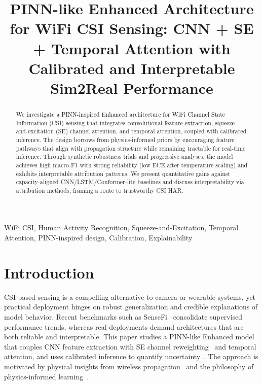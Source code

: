 \documentclass[journal]{IEEEtran}
\begin{document}
\title{PINN-like Enhanced Architecture for WiFi CSI Sensing: CNN + SE + Temporal Attention with Calibrated and Interpretable Sim2Real Performance}

\author{
}

\maketitle

\begin{abstract}
We investigate a PINN-inspired Enhanced architecture for WiFi Channel State Information (CSI) sensing that integrates convolutional feature extraction, squeeze-and-excitation (SE) channel attention, and temporal attention, coupled with calibrated inference. The design borrows from physics-informed priors by encouraging feature pathways that align with propagation structure while remaining tractable for real-time inference. Through synthetic robustness trials and progressive analyses, the model achieves high macro-F1 with strong reliability (low ECE after temperature scaling) and exhibits interpretable attribution patterns. We present quantitative gains against capacity-aligned CNN/LSTM/Conformer-lite baselines and discuss interpretability via attribution methods, framing a route to trustworthy CSI HAR.
\end{abstract}

\begin{IEEEkeywords}
WiFi CSI, Human Activity Recognition, Squeeze-and-Excitation, Temporal Attention, PINN-inspired design, Calibration, Explainability
\end{IEEEkeywords}

\section{Introduction}
CSI-based sensing is a compelling alternative to camera or wearable systems, yet practical deployment hinges on robust generalization and credible explanations of model behavior. Recent benchmarks such as SenseFi~\cite{yang2023sensefi} consolidate supervised performance trends, whereas real deployments demand architectures that are both reliable and interpretable. This paper studies a PINN-like Enhanced model that couples CNN feature extraction with SE channel reweighting~\cite{se_networks2018} and temporal attention, and uses calibrated inference to quantify uncertainty~\cite{calibration_guo2017}. The approach is motivated by physical insights from wireless propagation~\cite{goldsmith2005wireless} and the philosophy of physics-informed learning~\cite{pinn_karniadakis2019}.
\end{document}
